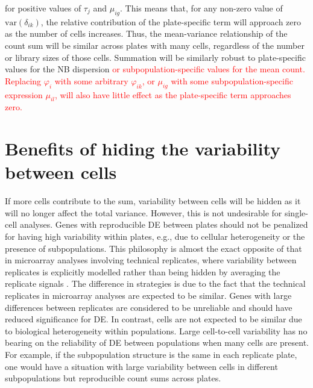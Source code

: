 \documentclass{article}
\newcommand\revised[1]{\textcolor{red}{#1}}
\begin{document}
for positive values of $\tau_j$ and $\mu_{ig}$.
This means that, for any non-zero value of $\mbox{var}(\delta_{ik})$, the relative contribution of the plate-specific term will approach zero as the number of cells increases.
Thus, the mean-variance relationship of the count sum will be similar across plates with many cells, regardless of the number or library sizes of those cells.
Summation will be similarly robust to plate-specific values for the NB dispersion \revised{or subpopulation-specific values for the mean count.
Replacing $\varphi_i$ with some arbitrary $\varphi_{ik}$, or $\mu_{ig}$ with some subpopulation-specific expression $\mu_{il}$, will also have little effect as the plate-specific term approaches zero.}




\section{Benefits of hiding the variability between cells}
If more cells contribute to the sum, variability between cells will be hidden as it will no longer affect the total variance.
However, this is not undesirable for single-cell analyses.
Genes with reproducible DE between plates should not be penalized for having high variability within plates, e.g., due to cellular heterogeneity or the presence of subpopulations.
This philosophy is almost the exact opposite of that in microarray analyses involving technical replicates,
    where variability between replicates is explicitly modelled rather than being hidden by averaging the replicate signals \citep{smyth2005use}.
The difference in strategies is due to the fact that the technical replicates in microarray analyses are expected to be similar.
Genes with large differences between replicates are considered to be unreliable and should have reduced significance for DE.
In contrast, cells are not expected to be similar due to biological heterogeneity within populations.
Large cell-to-cell variability has no bearing on the reliability of DE between populations when many cells are present.
For example, if the subpopulation structure is the same in each replicate plate, one would have a situation with large variability between cells in different subpopulations but reproducible count sums across plates.
\end{document}
